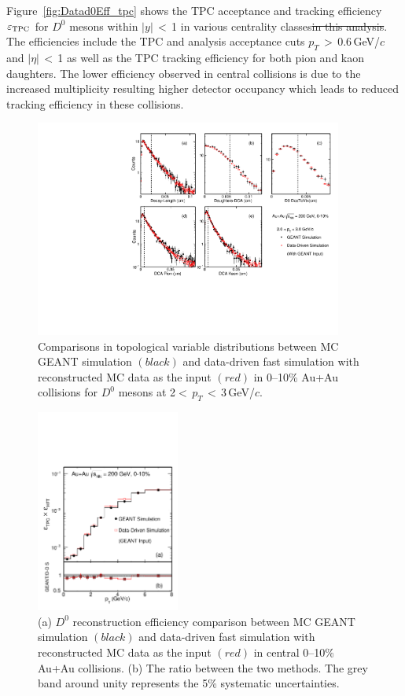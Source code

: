 \documentclass[%
 reprint,	
showpacs,
 amsmath,amssymb,
 aps,
 prc,
]{revtex4-1}
\providecommand{\DIFdeltex}[1]{{\protect\color{red}\sout{#1}}}                      %
\providecommand{\DIFdelbegin}{} %
\providecommand{\DIFdelend}{} %
\providecommand{\DIFdel}[1]{\texorpdfstring{\DIFdeltex{#1}}{}} %
\begin{document}
Figure~\ref{fig:Datad0Eff_tpc} shows the TPC acceptance and tracking efficiency $\varepsilon_{\rm TPC}$ for $D^0$ mesons within $|y|$\,$<$\,1 in various centrality classes\DIFdelbegin \DIFdel{in this analysis}\DIFdelend . The efficiencies include the TPC and analysis acceptance cuts $p_{T}$\,$>$\,0.6\,GeV/$c$ and $|\eta|$\,$<$\,1 as well as the TPC tracking efficiency for both pion and kaon daughters. The lower efficiency observed in central collisions is due to the increased multiplicity resulting higher detector occupancy which leads to reduced tracking efficiency in these collisions.



\begin{figure}
\centering
\includegraphics[width=0.90\textwidth]{fig/McTopo.pdf}
\caption{Comparisons in topological variable distributions between MC GEANT simulation $(black)$ and data-driven fast simulation with reconstructed MC data as the input $(red)$ in 0--10\% Au+Au collisions for $D^0$ mesons at 2$<$\,$p_T$\,$<$\,3\,GeV/$c$.}
\label{fig:McTopo} 
\end{figure}


\begin{figure}
\centering
\includegraphics[width=0.42\textwidth]{fig/Mcd0Eff_0_10.pdf}
  \caption{(a) $D^{0}$ reconstruction efficiency comparison between MC GEANT simulation $(black)$ and data-driven fast simulation with reconstructed MC data as the input $(red)$ in central 0--10\% Au+Au collisions. (b) The ratio between the two methods. The grey band around unity represents the 5\% systematic uncertainties.}
\label{fig:Mcd0Eff_0_10} 
\end{figure}
\end{document}
